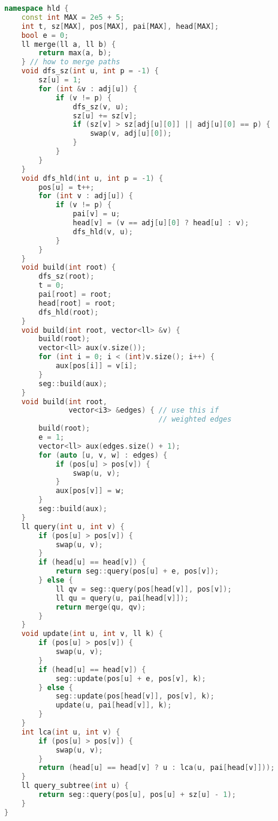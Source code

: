 \documentclass[11pt, a4paper, oneside]{book}
\begin{document}
\begin{multicols}{2}
\begin{lstlisting}[language=C++]
namespace hld {
    const int MAX = 2e5 + 5;
    int t, sz[MAX], pos[MAX], pai[MAX], head[MAX];
    bool e = 0;
    ll merge(ll a, ll b) {
        return max(a, b);
    } // how to merge paths
    void dfs_sz(int u, int p = -1) {
        sz[u] = 1;
        for (int &v : adj[u]) {
            if (v != p) {
                dfs_sz(v, u);
                sz[u] += sz[v];
                if (sz[v] > sz[adj[u][0]] || adj[u][0] == p) {
                    swap(v, adj[u][0]);
                }
            }
        }
    }
    void dfs_hld(int u, int p = -1) {
        pos[u] = t++;
        for (int v : adj[u]) {
            if (v != p) {
                pai[v] = u;
                head[v] = (v == adj[u][0] ? head[u] : v);
                dfs_hld(v, u);
            }
        }
    }
    void build(int root) {
        dfs_sz(root);
        t = 0;
        pai[root] = root;
        head[root] = root;
        dfs_hld(root);
    }
    void build(int root, vector<ll> &v) {
        build(root);
        vector<ll> aux(v.size());
        for (int i = 0; i < (int)v.size(); i++) {
            aux[pos[i]] = v[i];
        }
        seg::build(aux);
    }
    void build(int root,
               vector<i3> &edges) { // use this if
                                    // weighted edges
        build(root);
        e = 1;
        vector<ll> aux(edges.size() + 1);
        for (auto [u, v, w] : edges) {
            if (pos[u] > pos[v]) {
                swap(u, v);
            }
            aux[pos[v]] = w;
        }
        seg::build(aux);
    }
    ll query(int u, int v) {
        if (pos[u] > pos[v]) {
            swap(u, v);
        }
        if (head[u] == head[v]) {
            return seg::query(pos[u] + e, pos[v]);
        } else {
            ll qv = seg::query(pos[head[v]], pos[v]);
            ll qu = query(u, pai[head[v]]);
            return merge(qu, qv);
        }
    }
    void update(int u, int v, ll k) {
        if (pos[u] > pos[v]) {
            swap(u, v);
        }
        if (head[u] == head[v]) {
            seg::update(pos[u] + e, pos[v], k);
        } else {
            seg::update(pos[head[v]], pos[v], k);
            update(u, pai[head[v]], k);
        }
    }
    int lca(int u, int v) {
        if (pos[u] > pos[v]) {
            swap(u, v);
        }
        return (head[u] == head[v] ? u : lca(u, pai[head[v]]));
    }
    ll query_subtree(int u) {
        return seg::query(pos[u], pos[u] + sz[u] - 1);
    }
}
\end{lstlisting}
\end{multicols}
\end{document}
